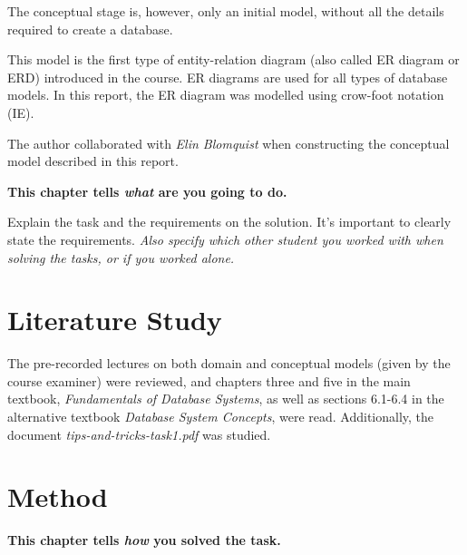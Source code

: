 \documentclass[a4paper]{scrartcl}
\begin{document}
The conceptual stage is, however, only an initial model, without all the details required to
create a database. 

This model is the first type of entity-relation diagram (also called ER diagram or
ERD) introduced in the course. ER diagrams are used for all types of database
models.  In this report, the ER diagram was modelled using crow-foot notation
(IE). 

The author collaborated with
\emph{Elin Blomquist}
when constructing the conceptual model
described in this report.

\textbf{This chapter tells \textit{what} are you going to do.} 

Explain the task and the requirements on the solution. It's important to clearly
state the requirements. \textit{Also specify which other student you worked with
when solving the tasks, or if you worked alone.} 

\section{Literature Study}


The pre-recorded lectures on both domain and conceptual models (given by the course examiner) were reviewed, 
and chapters three
and five in the main textbook, \emph{Fundamentals of Database Systems},%
as well as sections 6.1-6.4 in the alternative textbook \emph{Database System Concepts}, 
were read. 
Additionally, the document \emph{tips-and-tricks-task1.pdf} %
was studied.

\section{Method}

\textbf{This chapter tells \textit{how} you solved the task.}

\end{document}
